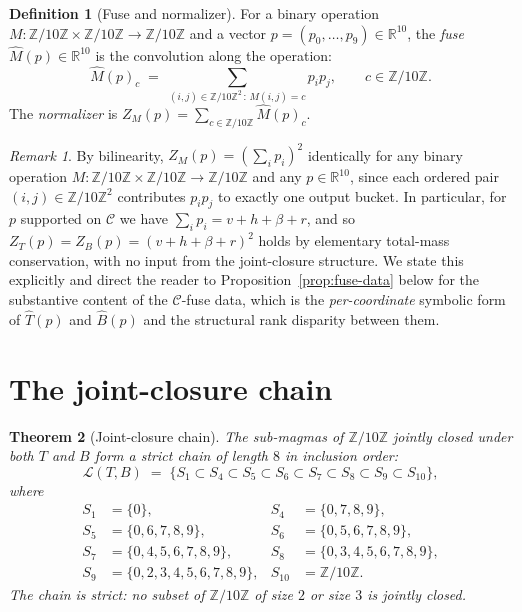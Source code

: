 \documentclass[11pt,reqno]{amsart}
\theoremstyle{plain}
\newtheorem{theorem}{Theorem}
\theoremstyle{definition}
\newtheorem{definition}[theorem]{Definition}
\theoremstyle{remark}
\newtheorem*{remark}{Remark}
\newcommand{\Z}{\mathbb{Z}}
\newcommand{\R}{\mathbb{R}}
\newcommand{\Zten}{\Z/10\Z}
\newcommand{\Cfour}{\mathcal{C}}
\newcommand{\Tfuse}{\widehat{T}}
\newcommand{\Bfuse}{\widehat{B}}
\begin{document}
\begin{definition}[Fuse and normalizer]\label{def:fuse}
For a binary operation $M:\Zten\times\Zten\to\Zten$ and a vector
$p=(p_{0},\dots,p_{9})\in\R^{10}$, the \emph{fuse}
$\widehat{M}(p)\in\R^{10}$ is the convolution along the operation:
\[
\widehat{M}(p)_{c}\;=\;\sum_{(i,j)\in\Zten^{2}\,:\,M(i,j)=c}p_{i}p_{j},
\qquad c\in\Zten.
\]
The \emph{normalizer} is $Z_{M}(p)=\sum_{c\in\Zten}\widehat{M}(p)_{c}$.
\end{definition}

\begin{remark}\label{rem:total-mass}
By bilinearity, $Z_{M}(p) = (\sum_{i}p_{i})^{2}$ identically for
any binary operation $M:\Zten\times\Zten\to\Zten$ and any
$p\in\R^{10}$, since each ordered pair $(i,j)\in\Zten^{2}$
contributes $p_{i}p_{j}$ to exactly one output bucket. In
particular, for $p$ supported on $\Cfour$ we have
$\sum_{i}p_{i} = v+h+\beta+r$, and so
$Z_{T}(p) = Z_{B}(p) = (v+h+\beta+r)^{2}$ holds by elementary
total-mass conservation, with no input from the joint-closure
structure. We state this explicitly and direct the reader to
Proposition~\ref{prop:fuse-data} below for the substantive
content of the $\Cfour$-fuse data, which is the
\emph{per-coordinate} symbolic form of $\Tfuse(p)$ and
$\Bfuse(p)$ and the structural rank disparity between them.
\end{remark}

\section{The joint-closure chain}\label{sec:chain}

\begin{theorem}[Joint-closure chain]\label{thm:chain}
The sub-magmas of $\Zten$ jointly closed under both $T$ and $B$
form a strict chain of length $8$ in inclusion order:
\[
\mathcal{L}(T,B)\;=\;\bigl\{S_{1}\subset S_{4}\subset S_{5}\subset
S_{6}\subset S_{7}\subset S_{8}\subset S_{9}\subset S_{10}\bigr\},
\]
where
\begin{align*}
S_{1}&=\{0\}, & S_{4}&=\{0,7,8,9\}, \\
S_{5}&=\{0,6,7,8,9\}, & S_{6}&=\{0,5,6,7,8,9\}, \\
S_{7}&=\{0,4,5,6,7,8,9\}, & S_{8}&=\{0,3,4,5,6,7,8,9\}, \\
S_{9}&=\{0,2,3,4,5,6,7,8,9\}, & S_{10}&=\Zten.
\end{align*}
The chain is strict: no subset of $\Zten$ of size $2$ or size $3$
is jointly closed.
\end{theorem}
\end{document}
